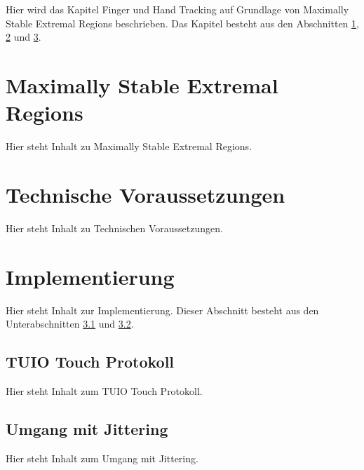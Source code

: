 Hier wird das Kapitel Finger und Hand Tracking auf Grundlage von Maximally Stable Extremal Regions beschrieben. Das Kapitel besteht aus den Abschnitten \ref{sec:maximally_stable_extremal_regions}, \ref{sec:technische_voraussetzungen} und \ref{sec:implementierung_mser}. 


\section{Maximally Stable Extremal Regions}
\label{sec:maximally_stable_extremal_regions}

Hier steht Inhalt zu Maximally Stable Extremal Regions.


\section{Technische Voraussetzungen}
\label{sec:technische_voraussetzungen}

Hier steht Inhalt zu Technischen Voraussetzungen.


\section{Implementierung}
\label{sec:implementierung_mser}

Hier steht Inhalt zur Implementierung. Dieser Abschnitt besteht aus den Unterabschnitten \ref{subsec:tuio_touch_protokoll} und \ref{subsec:umgang_mit_jittering}.

\subsection{TUIO Touch Protokoll}
\label{subsec:tuio_touch_protokoll}

Hier steht Inhalt zum TUIO Touch Protokoll.

\subsection{Umgang mit Jittering}
\label{subsec:umgang_mit_jittering}

Hier steht Inhalt zum Umgang mit Jittering.

